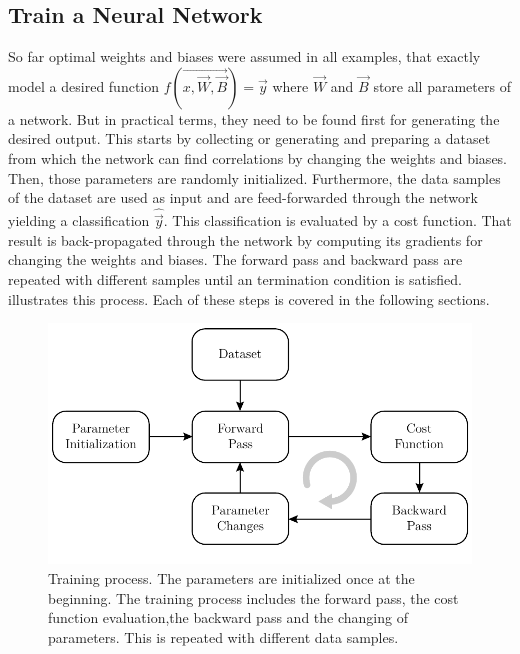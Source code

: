 \subsection{Train a Neural Network}
\label{sec:neural-networks-training}
So far optimal weights and biases were assumed in all examples, that exactly model a desired function $f(\vec{x, \vec{W}, \vec{B}}) = \vec{y}$ where $\vec{W}$ and $\vec{B}$ store all parameters of a network.
But in practical terms, they need to be found first for generating the desired output.
This starts by collecting or generating and preparing a dataset from which the network can find correlations by changing the weights and biases.
Then, those parameters are randomly initialized.
Furthermore, the data samples of the dataset are used as input and are feed-forwarded through the network yielding a classification $\hat{\vec{y}}$.
This classification is evaluated by a cost function.
That result is back-propagated through the network by computing its gradients for changing the weights and biases.
The forward pass and backward pass are repeated with different samples until an termination condition is satisfied.
 illustrates this process.
Each of these steps is covered in the following sections.
\begin{figure}
	\centering
	\includegraphics{images/training.pdf}
	\caption[Training process]{Training process. The parameters are initialized once at the beginning. The training process includes the forward pass, the cost function evaluation,the backward pass and the changing of parameters. This is repeated with different data samples.}
	\label{fig:training}
\end{figure}





